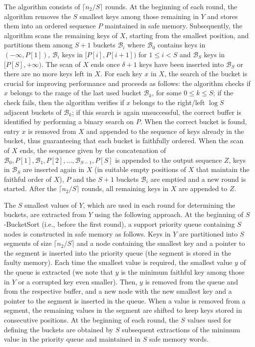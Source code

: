 \documentclass[review,number]{elsarticle}
\newcommand{\B}{\mathcal{B}}
\newcommand{\SBucketSort}{$S$-\textsf{BucketSort}}
\begin{document}
The algorithm consists of $\lceil n_2/S \rceil$ rounds. At the beginning of each
round, the algorithm removes the $S$ smallest keys among those remaining in $Y$
and stores them into an ordered sequence $P$ maintained in safe memory.
Subsequently, the algorithm scans the remaining keys of $X$, starting from the
smallest position, and partitions them among $S+1$ buckets $\B_i$ where $\B_0$
contains keys in $(-\infty, P[1])$, $\B_i$ keys in $[P[i],P[i+1])$ for $1\leq i<
S$ and $\B_S$ keys in $[P[S],+\infty)$. The scan of $X$ ends  once $\delta+1$
keys have been inserted into $\B_S$ or there are no more keys left in $X$. For
each key $x$ in $X$, the search of the bucket is crucial for improving
performance and proceeds as follows: the algorithm checks if $x$ belongs to the
range of the last used bucket $\B_k$, for some $0\leq k\leq S$; if the check
fails, then the algorithm verifies if $x$ belongs to the right/left $\log S$
adjacent buckets of $\B_k$; if this search is again unsuccessful, the correct
buffer is identified by performing a binary search on $P$. When the correct
bucket is found, entry $x$ is removed from $X$ and appended to the sequence of
keys already in the bucket, thus guaranteeing that each bucket is faithfully
ordered. When the scan of $X$ ends, the sequence given by the concatenation of
$\B_0, P[1], \B_1, P[2],\ldots, \B_{S-1}, P[S]$ is appended to the output
sequence $Z$, keys in $\B_S$ are inserted again in $X$ (in suitable empty
positions of $X$ that maintain the faithful order of $X$), $P$ and the $S+1$
buckets $\B_i$ are emptied and a new round is started. After the  $\lceil n_2/S
\rceil$ rounds, all remaining keys in $X$ are appended to $Z$.


The $S$ smallest values of $Y$, which are used in each round for determining the
buckets, are extracted from $Y$ using the following approach. At the beginning
of \SBucketSort{} (i.e., before the first round), a support priority queue
containing $S$ nodes is constructed in safe memory as follows. Keys in $Y$ are
partitioned into $S$ segments of size $\lceil n_2 /S \rceil$ and a node
containing the smallest key and a pointer to the segment is inserted
into the priority queue (the segment is stored in the faulty memory). Each time
the smallest value is required, the smallest value $y$ of the queue is
extracted (we note that $y$ is the minimum faithful key among those in $Y$ or a
corrupted key even smaller). Then, $y$ is removed from the queue and from the
respective buffer, and a new node with the new smallest key and a pointer to the
segment is inserted in the queue. When a value is removed from a segment, the
remaining values in the segment are shifted to keep keys stored in
consecutive positions. At the beginning of each round, the $S$ values
used for defining the buckets are obtained by $S$ subsequent extractions of the
minimum value in the priority queue and maintained in $S$ safe memory words.
\end{document}
